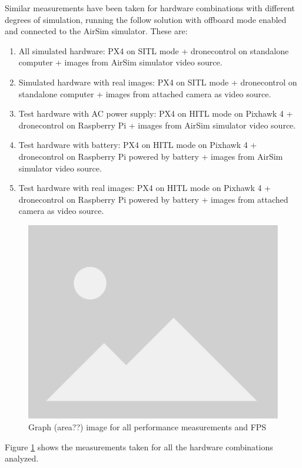 Similar measurements have been taken for hardware combinations with different degrees of simulation, running the follow solution with offboard mode enabled and connected to the AirSim simulator.
These are:
\begin{enumerate}
    \item All simulated hardware: PX4 on SITL mode + dronecontrol on standalone computer + images from AirSim simulator video source.
    \item Simulated hardware with real images: PX4 on SITL mode + dronecontrol on standalone computer + images from attached camera as video source.
    \item Test hardware with AC power supply: PX4 on HITL mode on Pixhawk 4 + dronecontrol on Raspberry Pi + images from AirSim simulator video source.
    \item Test hardware with battery: PX4 on HITL mode on Pixhawk 4 + dronecontrol on Raspberry Pi powered by battery + images from AirSim simulator video source.
    \item Test hardware with real images: PX4 on HITL mode on Pixhawk 4 + dronecontrol on Raspberry Pi powered by battery + images from attached camera as video source.
\end{enumerate}


\begin{figure}
  \centering
  \includegraphics[width=.8\textwidth, keepaspectratio]{img/placeholder.png}
  \caption{Graph (area??) image for all performance measurements and FPS}
  \label{fig:perf-analysis}
\end{figure}


Figure \ref{fig:perf-analysis} shows the measurements taken for all the hardware combinations analyzed.



